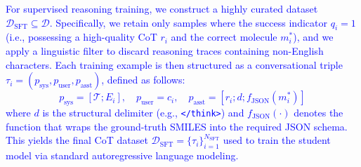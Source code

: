 \documentclass[11pt]{article}
\begin{document}
\textcolor{blue}{For supervised reasoning training, we construct a highly curated dataset $\mathcal{D}_{\text{SFT}} \subseteq \mathcal{D}$. Specifically, we retain only samples where the success indicator $q_i = 1$ (i.e., possessing a high-quality CoT $r_i$ and the correct molecule $m_i^*$), and we apply a linguistic filter to discard reasoning traces containing non-English characters. Each training example is then structured as a conversational triple $\tau_i = (p_{\text{sys}}, p_{\text{user}}, p_{\text{asst}})$, defined as follows:
\begin{equation}
     p_{\text{sys}} = [\mathcal{T}; E_i], \quad p_{\text{user}} = c_i, \quad p_{\text{asst}} = [r_i; d; f_{\text{JSON}}(m_i^*)] 
\end{equation}
where $d$ is the structural delimiter (e.g., \texttt{</think>}) and $f_{\text{JSON}}(\cdot)$ denotes the function that wraps the ground-truth SMILES into the required JSON schema. This yields the final CoT dataset $\mathcal{D}_{\text{SFT}} = \{\tau_i\}_{i=1}^{N_{\text{SFT}}}$ used to train the student model via standard autoregressive language modeling.}
\end{document}
